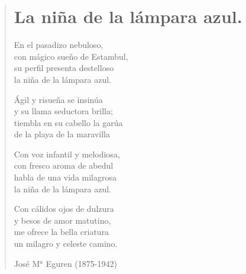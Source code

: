 \documentclass[12pt, twoside]{book}
\begin{document}
\begin{verse}
\begin{center}
\section{La niña de la lámpara azul.}
\end{center}

En el pasadizo nebuloso,\\
con mágico sueño de Estambul,\\
su perfil presenta destelloso\\
la niña de la lámpara azul.
\newline

Ágil y risueña se insinúa\\
y su llama seductora brilla;\\
tiembla en su cabello la garúa\\
de la playa de la maravilla
\newline

Con voz infantil y melodiosa,\\
con fresco aroma de abedul\\
habla de una vida milagrosa\\
la niña de la lámpara azul.
\newline

Con cálidos ojos de dulzura\\
y besos de amor matutino,\\
me ofrece la bella criatura\\
un milagro y celeste camino.
\newline

José M$^a$ Eguren (1875-1942)
\end{verse}
\newpage
\end{document}
